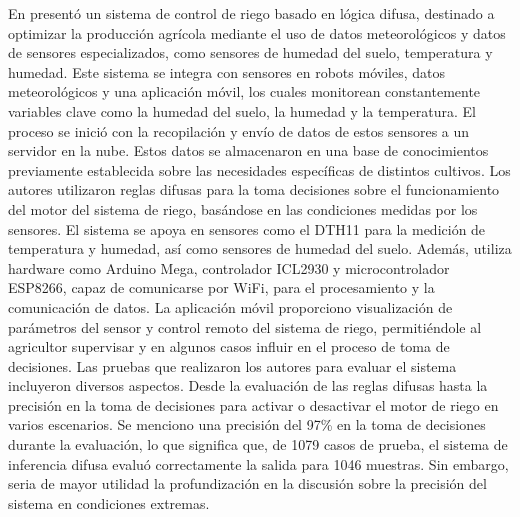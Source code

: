 \bigbreak
En \cite{noauthor_fuzzy_2023} presentó un sistema de control de riego basado en lógica difusa, destinado a optimizar la producción agrícola mediante el uso de datos meteorológicos y datos de sensores especializados, como sensores de humedad del suelo, temperatura y humedad. Este sistema se integra con sensores en robots móviles, datos meteorológicos y una aplicación móvil, los cuales monitorean constantemente variables clave como la humedad del suelo, la humedad y la temperatura. El proceso se inició con la recopilación y envío de datos de estos sensores a un servidor en la nube. Estos datos se almacenaron en una base de conocimientos previamente establecida sobre las necesidades específicas de distintos cultivos. Los autores utilizaron reglas difusas para la toma decisiones sobre el funcionamiento del motor del sistema de riego, basándose en las condiciones medidas por los sensores. El sistema se apoya en sensores como el DTH11 para la medición de temperatura y humedad, así como sensores de humedad del suelo. Además, utiliza hardware como Arduino Mega, controlador ICL2930 y microcontrolador ESP8266, capaz de comunicarse por WiFi, para el procesamiento y la comunicación de datos. La aplicación móvil proporciono visualización de parámetros del sensor y control remoto del sistema de riego, permitiéndole al agricultor supervisar y en algunos casos influir en el proceso de toma de decisiones. Las pruebas que realizaron los autores para evaluar el sistema incluyeron diversos aspectos. Desde la evaluación de las reglas difusas hasta la precisión en la toma de decisiones para activar o desactivar el motor de riego en varios escenarios. Se menciono una precisión del 97\% en la toma de decisiones durante la evaluación, lo que significa que, de 1079 casos de prueba, el sistema de inferencia difusa evaluó correctamente la salida para 1046 muestras. Sin embargo, seria de mayor utilidad la profundización en la discusión sobre la precisión del sistema en condiciones extremas.

